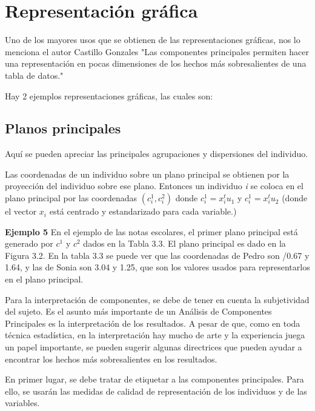 \section{Representación gráfica}
 Uno de los mayores usos que se obtienen de las representaciones gráficas, nos lo menciona el autor Castillo Gonzales "Las componentes principales permiten hacer una representación en pocas dimensiones de los hechos más sobresalientes de una tabla de datos." \cite{CastilloGonzalez}
 
 Hay 2 ejemplos representaciones gráficas, las cuales son:
 
 \subsection{Planos principales}
 Aquí se pueden apreciar las principales agrupaciones y dispersiones del individuo.
 
 Las coordenadas de un individuo sobre un plano principal se obtienen por la proyección del individuo sobre ese plano. Entonces un individuo \textit{i} se coloca en el plano principal por las coordenadas $(c_{\textit{i}}^{1},c_{\textit{i}}^{2})$ donde $c_{\textit{i}}^{1} = x_{\textit{i}}^{t}u_{1}$ y $c_{\textit{i}}^{1} = x_{\textit{i}}^{t}u_{2}$ (donde el vector $x_{\textit{i}}$ está centrado y estandarizado para cada variable.) 
 
 \textbf{Ejemplo 5} En el ejemplo de las notas escolares, el primer plano principal está generado por $c^{1}$ y $c^{2}$ dados en la Tabla 3.3. El plano principal es dado en la Figura 3.2. En la tabla 3.3 se puede ver que las coordenadas de Pedro son /0.67 y 1.64, y las de Sonia son 3.04 y 1.25, que son los valores usados para representarlos en el plano principal.
 
 Para la interpretación de componentes, se debe de tener en cuenta la subjetividad del sujeto. 
 Es el asunto más importante de un Análisis de Componentes Principales es la interpretación de los resultados. A pesar de que, como en toda técnica estadística, en la interpretación hay mucho de arte y la experiencia juega un papel importante, se pueden sugerir algunas directrices que pueden ayudar a encontrar los hechos más sobresalientes en los resultados.

En primer lugar, se debe tratar de etiquetar a las componentes principales. Para ello, se usarán las medidas de calidad de representación de los individuos y de las variables. \cite{CastilloGonzalez}
 
